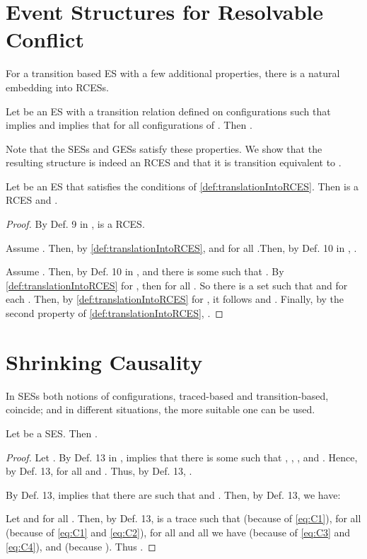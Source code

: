 \documentclass[runningheads,a4paper]{llncs}
\begin{document}
\section{Event Structures for Resolvable Conflict}

For a transition based ES with a few additional properties, there is a natural
embedding into RCESs.
\begin{definition}\label{def:translationIntoRCES}
	Let  be an ES with a transition relation  defined on configurations such that
 implies  and
 implies that 
for all configurations  of .	Then .
\end{definition}
Note that the SESs and GESs satisfy these properties. We show that the resulting
structure  is indeed an RCES and that it is transition equivalent to .
\begin{lemma}	\label{lma:TransInRCES}
	Let  be an ES that satisfies the conditions of \ref{def:translationIntoRCES}.	Then  is a RCES and .
\end{lemma}
\begin{proof}
	By Def. 9 in \cite{dynamicCausality15},  is a RCES.
	
	Assume . Then, by \ref{def:translationIntoRCES},  and  for all .Then, by Def. 10 in \cite{dynamicCausality15}, .
	
	Assume . Then, by Def. 10 in \cite{dynamicCausality15},  and there is some  such that . By \ref{def:translationIntoRCES} for , then  for all . So there is a set  such that  and  for each . Then, by \ref{def:translationIntoRCES} for , it follows  and . Finally, by the second property of \ref{def:translationIntoRCES}, .
\end{proof}

\section{Shrinking Causality}

In SESs both notions of configurations, traced-based and transition-based,
coincide; and in different situations, the more suitable one can be used.

\begin{lemma}\label{lem:SESconf}
	Let  be a SES. Then .
\end{lemma}

\begin{proof}
	Let .	By Def. 13 in \cite{dynamicCausality15},  implies that there is some  such that , , , and .	Hence, by Def. 13,  for all  and .	Thus, by Def. 13, .
	
	By Def. 13,  implies that there are  such that  and .
	Then, by Def. 13, we have:
	
	Let  and  for all .	Then, by Def. 13,  is a trace such that  (because of \eqref{eq:C1}),  for all  (because of \eqref{eq:C1} and \eqref{eq:C2}), for all  and all  we have  (because of \eqref{eq:C3} and \eqref{eq:C4}), and  (because ).
	Thus .
\end{proof}
\end{document}

